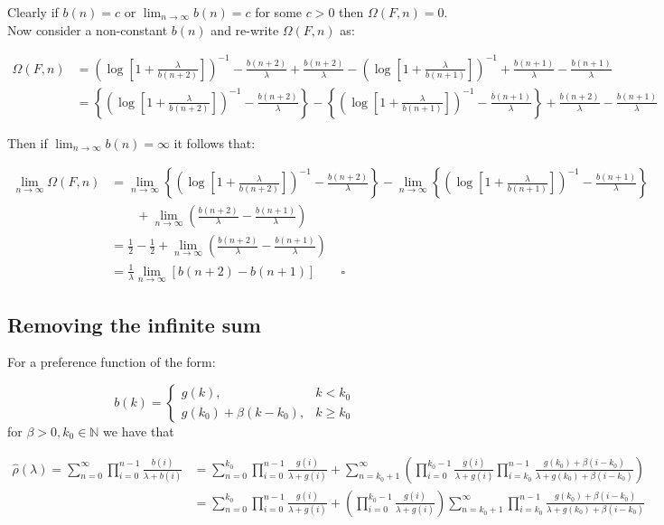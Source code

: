 \documentclass[
  sn-basic,
]{sn-jnl}
\theoremstyle{plain}
\theoremstyle{remark}
\begin{document}
Clearly if \(b(n)=c\) or \(\lim_{n\rightarrow\infty}b(n)=c\) for some
\(c>0\) then \(\Omega(F,n)=0\). Now consider a non-constant \(b(n)\) and
re-write \(\Omega(F,n)\) as:

\begin{align*}
\Omega(F,n) &= \left(\log\left[1+\frac{\lambda}{b(n+2)}\right]\right)^{-1}-\frac{b(n+2)}{\lambda}+\frac{b(n+2)}{\lambda}-\left(\log\left[1+\frac{\lambda}{b(n+1)}\right]\right)^{-1}+\frac{b(n+1)}{\lambda}  -\frac{b(n+1)}{\lambda}\\
&=\left\{ \left(\log\left[1+\frac{\lambda}{b(n+2)}\right]\right)^{-1}-\frac{b(n+2)}{\lambda}\right\} - \left\{ \left(\log\left[1+\frac{\lambda}{b(n+1)}\right]\right)^{-1}-\frac{b(n+1)}{\lambda}\right\}+\frac{b(n+2)}{\lambda}-\frac{b(n+1)}{\lambda}
\end{align*}

Then if \(\lim_{n\rightarrow\infty}b(n)=\infty\) it follows that:

\begin{align*}
\lim_{n\rightarrow\infty}\Omega(F,n) &= \lim_{n\rightarrow\infty}\left\{ \left(\log\left[1+\frac{\lambda}{b(n+2)}\right]\right)^{-1}-\frac{b(n+2)}{\lambda}\right\} - \lim_{n\rightarrow\infty}\left\{ \left(\log\left[1+\frac{\lambda}{b(n+1)}\right]\right)^{-1}-\frac{b(n+1)}{\lambda}\right\}\\
&\qquad+\lim_{n\rightarrow\infty}\left(\frac{b(n+2)}{\lambda}-\frac{b(n+1)}{\lambda}\right)\\
&=\frac{1}{2}-\frac{1}{2} + \lim_{n\rightarrow\infty}\left(\frac{b(n+2)}{\lambda}-\frac{b(n+1)}{\lambda}\right)\\
&=\frac{1}{\lambda}\lim_{n\rightarrow\infty}\left[b(n+2)-b(n+1)\right]\qquad \square
\end{align*}

\newpage

\subsection{Removing the infinite sum}\label{removing-the-infinite-sum}

For a preference function of the form:

\[
b(k) = \begin{cases}
g(k),&k<k_0\\
g(k_0) + \beta(k-k_0), &k\ge k_0
\end{cases}
\] for \(\beta>0, k_0\in\mathbb N\) we have that

\begin{align*}
\hat\rho(\lambda) = \sum_{n=0}^\infty\prod_{i=0}^{n-1}\frac{b(i)}{\lambda+b(i)} &= \sum_{n=0}^{k_0}\prod_{i=0}^{n-1}\frac{g(i)}{\lambda+g(i)} + \sum_{n=k_0+1}^\infty\left(\prod_{i=0}^{k_0-1}\frac{g(i)}{\lambda+g(i)}\prod_{i=k_0}^{n-1}\frac{g(k_0) + \beta(i-k_0)}{\lambda +g(k_0) + \beta(i-k_0)}\right)\\
&=\sum_{n=0}^{k_0}\prod_{i=0}^{n-1}\frac{g(i)}{\lambda+g(i)} + \left(\prod_{i=0}^{k_0-1}\frac{g(i)}{\lambda+g(i)}\right)\sum_{n=k_0+1}^\infty\prod_{i=k_0}^{n-1}\frac{g(k_0) + \beta(i-k_0)}{\lambda +g(k_0) + \beta(i-k_0)}
\end{align*}
\end{document}
